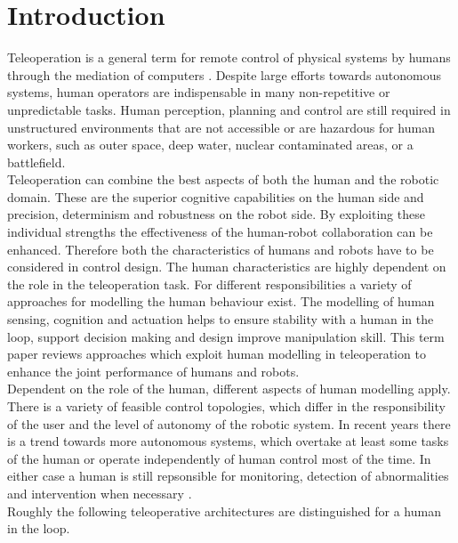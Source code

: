 \documentclass[a4paper,twoside, openright,12pt]{report}
\begin{document}
\chapter{Introduction}

Teleoperation is a general term for remote control of physical systems by humans through the mediation of computers \cite{TeleoperationHandbook}. Despite large efforts towards autonomous systems, human operators are indispensable in many non-repetitive or unpredictable tasks. Human perception, planning and control are still required in unstructured environments that are not accessible or are hazardous for human workers, such as outer space, deep water, nuclear contaminated areas, or a battlefield.\\
Teleoperation can combine the best aspects of both the human and the robotic domain. These are the superior cognitive capabilities on the human side and  precision, determinism and robustness on the robot side. By exploiting these individual strengths the effectiveness of the human-robot collaboration can be enhanced. Therefore both the characteristics of humans and robots have to be considered in control design. The human characteristics are highly dependent on the role in the teleoperation task. For different responsibilities a variety of approaches for modelling the human behaviour exist. The modelling of human sensing, cognition and actuation helps to ensure stability with a human in the loop, support decision making and design improve manipulation skill. This term paper reviews approaches which exploit human modelling in teleoperation to enhance the joint performance of humans and robots.\\
Dependent on the role of the human, different aspects of human modelling apply. There is a variety of feasible control topologies, which differ in the responsibility of the user and the level of autonomy of the robotic system. In recent years there is a trend towards more autonomous systems, which overtake at least some tasks of the human or operate independently of human control most of the time. In either case a human is still repsonsible for monitoring, detection of abnormalities and intervention when necessary \cite{Sheridian1992}.\\
Roughly the following teleoperative architectures are distinguished for a human in the loop.
\end{document}
